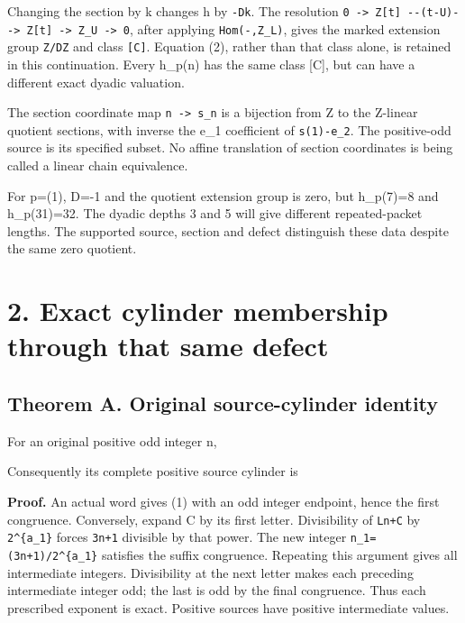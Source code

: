 
Changing the section by k changes h by \nolinkurl{-Dk}. The resolution
\nolinkurl{0 -> Z[t] --(t-U)--> Z[t] -> Z_U -> 0}, after applying
\nolinkurl{Hom(-,Z_L)}, gives the marked extension group
\nolinkurl{Z/DZ} and class \nolinkurl{[C]}. Equation (2), rather than
that class alone, is retained in this continuation. Every h\_p(n) has
the same class {[}C{]}, but can have a different exact dyadic valuation.

The section coordinate map \nolinkurl{n -> s_n} is a bijection from Z to
the Z-linear quotient sections, with inverse the e\_1 coefficient of
\nolinkurl{s(1)-e_2}. The positive-odd source is its specified subset.
No affine translation of section coordinates is being called a linear
chain equivalence.

For p=(1), D=-1 and the quotient extension group is zero, but h\_p(7)=8
and h\_p(31)=32. The dyadic depths 3 and 5 will give different
repeated-packet lengths. The supported source, section and defect
distinguish these data despite the same zero quotient.

\section{2. Exact cylinder membership through that same defect}

\subsection{Theorem A. Original source-cylinder identity}

For an original positive odd integer n,


Consequently its complete positive source cylinder is


\textbf{Proof.} An actual word gives (1) with an odd integer endpoint,
hence the first congruence. Conversely, expand C by its first letter.
Divisibility of \nolinkurl{Ln+C} by \texttt{2\^{}\{a\_1\}} forces
\nolinkurl{3n+1} divisible by that power. The new integer
\texttt{n\_1=(3n+1)/2\^{}\{a\_1\}} satisfies the suffix congruence.
Repeating this argument gives all intermediate integers. Divisibility at
the next letter makes each preceding intermediate integer odd; the last
is odd by the final congruence. Thus each prescribed exponent is exact.
Positive sources have positive intermediate values.

